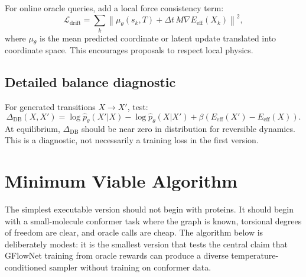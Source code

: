 \documentclass[11pt]{article}
\begin{document}
For online oracle queries, add a local force consistency term:
\[
\mathcal{L}_{\mathrm{drift}}
=
\sum_{k}
\left\|
\mu_\theta(s_k,T)
+\Delta t\,M\nabla E_{\mathrm{eff}}(X_k)
\right\|^2,
\]
where $\mu_\theta$ is the mean predicted coordinate or latent update translated into coordinate space. This encourages proposals to respect local physics.

\subsection{Detailed balance diagnostic}

For generated transitions $X\to X'$, test:
\[
\Delta_{\mathrm{DB}}(X,X')=
\log \hat{p}_\theta(X'|X)
-\log \hat{p}_\theta(X|X')
+\beta\left(E_{\mathrm{eff}}(X')-E_{\mathrm{eff}}(X)\right).
\]
At equilibrium, $\Delta_{\mathrm{DB}}$ should be near zero in distribution for reversible dynamics. This is a diagnostic, not necessarily a training loss in the first version.

\section{Minimum Viable Algorithm}

The simplest executable version should not begin with proteins. It should begin with a small-molecule conformer task where the graph is known, torsional degrees of freedom are clear, and oracle calls are cheap. The algorithm below is deliberately modest: it is the smallest version that tests the central claim that GFlowNet training from oracle rewards can produce a diverse temperature-conditioned sampler without training on conformer data.
\end{document}
